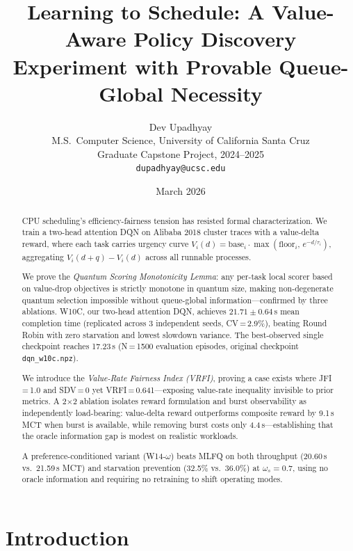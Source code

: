\documentclass[10pt,twocolumn]{article}
\title{\textbf{Learning to Schedule: A Value-Aware Policy Discovery\\
Experiment with Provable Queue-Global Necessity}}
\author{Dev Upadhyay\\
M.S.\ Computer Science, University of California Santa Cruz\\
Graduate Capstone Project, 2024--2025\\
\texttt{dupadhyay@ucsc.edu}}
\date{March 2026}
\theoremstyle{remark}
\newcommand{\vrfi}{\textsc{VRFI}}
\begin{document}
\maketitle

\begin{abstract}

CPU scheduling's efficiency-fairness tension has resisted formal
characterization. We train a two-head attention DQN on Alibaba 2018
cluster traces with a value-delta reward, where each task carries
urgency curve $V_i(d) = \mathrm{base}_i \cdot
\max(\mathrm{floor}_i,\, e^{-d/\tau_i})$, aggregating
$V_i(d+q) - V_i(d)$ across all runnable processes.

We prove the \emph{Quantum Scoring Monotonicity Lemma}: any
per-task local scorer based on value-drop objectives is strictly
monotone in quantum size, making non-degenerate quantum selection
impossible without queue-global information---confirmed by three
ablations. W10C, our two-head attention DQN, achieves
$21.71 \pm 0.64$\,s mean completion time (replicated across 3
independent seeds, CV\,=\,2.9\%), beating Round Robin with zero
starvation and lowest slowdown variance. The best-observed single
checkpoint reaches 17.23\,s (N\,=\,1500 evaluation episodes,
original checkpoint \texttt{dqn\_w10c.npz}).

We introduce the \emph{Value-Rate Fairness Index (\vrfi)}, proving
a case exists where JFI\,=\,1.0 and SDV\,=\,0 yet
\vrfi\,=\,0.641---exposing value-rate inequality invisible to prior
metrics. A 2$\times$2 ablation isolates reward formulation and burst
observability as independently load-bearing: value-delta reward
outperforms composite reward by 9.1\,s MCT when burst is available,
while removing burst costs only 4.4\,s---establishing that the oracle
information gap is modest on realistic workloads.

A preference-conditioned variant (W14-$\omega$) beats MLFQ on both
throughput (20.60\,s vs.\ 21.59\,s MCT) and starvation prevention
(32.5\% vs.\ 36.0\%) at $\omega_s=0.7$, using no oracle information
and requiring no retraining to shift operating modes.

\end{abstract}

\section{Introduction}
\end{document}
